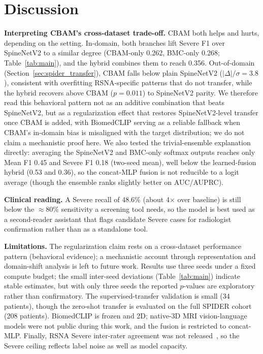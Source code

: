 \documentclass[runningheads]{llncs}
\begin{document}
\section{Discussion}\label{sec:disc}

\textbf{Interpreting CBAM's cross-dataset trade-off.} CBAM both helps and hurts, depending on the setting. In-domain, both branches lift Severe F1 over SpineNetV2 to a similar degree (CBAM-only 0.262, BMC-only 0.268; Table~\ref{tab:main}), and the hybrid combines them to reach 0.356. Out-of-domain (Section~\ref{sec:spider_transfer}), CBAM falls below plain SpineNetV2 ($|\Delta|/\sigma = 3.8$), consistent with overfitting RSNA-specific patterns that do not transfer, while the hybrid recovers above CBAM ($p=0.011$) to SpineNetV2 parity. We therefore read this behavioral pattern not as an additive combination that beats SpineNetV2, but as a regularization effect that restores SpineNetV2-level transfer once CBAM is added, with BiomedCLIP serving as a reliable fallback when CBAM's in-domain bias is misaligned with the target distribution; we do not claim a mechanistic proof here. We also tested the trivial-ensemble explanation directly: averaging the SpineNetV2 and BMC-only softmax outputs reaches only Mean F1 0.45 and Severe F1 0.18 (two-seed mean), well below the learned-fusion hybrid (0.53 and 0.36), so the concat-MLP fusion is not reducible to a logit average (though the ensemble ranks slightly better on AUC/AUPRC).

\textbf{Clinical reading.} A Severe recall of 48.6\% (about 4$\times$ over baseline) is still below the $\approx$80\% sensitivity a screening tool needs, so the model is best used as a second-reader assistant that flags candidate Severe cases for radiologist confirmation rather than as a standalone tool.

\textbf{Limitations.} The regularization claim rests on a cross-dataset performance pattern (behavioral evidence); a mechanistic account through representation and domain-shift analysis is left to future work. Results use three seeds under a fixed compute budget; the small inter-seed deviations (Table~\ref{tab:main}) indicate stable estimates, but with only three seeds the reported $p$-values are exploratory rather than confirmatory. The supervised-transfer validation is small (34 patients), though the zero-shot transfer is evaluated on the full SPIDER cohort (208 patients). BiomedCLIP is frozen and 2D; native-3D MRI vision-language models were not public during this work, and the fusion is restricted to concat-MLP. Finally, RSNA Severe inter-rater agreement was not released~\cite{kaggle2024}, so the Severe ceiling reflects label noise as well as model capacity.
\end{document}
